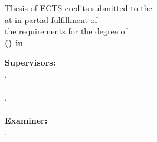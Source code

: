 \begin{titlepage}
  \thispagestyle{empty}%
  \singlespacing%
  
  \begin{center}
    \par
    \vspace{0.8cm}
    
    {\bfseries\Large \thesisTitle\par}
    \vspace{0.8cm}
    
    {\large \thesisAuthor\par}
    \vspace{1.0cm}
    
    {\large
      Thesis of \thesisECTS{} ECTS credits submitted to the \thesisSchool{}\\
      at \thesisUniversity{} in partial fulfillment of\\
      the requirements for the degree of\\
      \textbf{\thesisDegreeLong{} (\thesisDegreeAbbrv{}) in \thesisProgram{}}\par
    }
    \vspace{0.8cm}
    
    {\large \thesisDate\par}
  \end{center}
  
  \vfill
  
  \begin{flushleft}
    \setlength{\parskip}{2pt}%
    \textbf{Supervisors:}\\[2pt]
    \thesisSupervisor, \thesisSupervisorRole{}\\
    \thesisSupervisorAffiliation{}\\[0.5\baselineskip]
    \ifx\thesisCoSupervisor\empty\else
    \thesisCoSupervisor, \thesisCoSupervisorRole{}\\
    \thesisCoSupervisorAffiliation{}\\[0.5\baselineskip]
    \fi
    \textbf{Examiner:}\\[2pt]
    \thesisExaminer, \thesisExaminerRole{}\\
    \thesisExaminerAffiliation{}\par
  \end{flushleft}
\end{titlepage}
